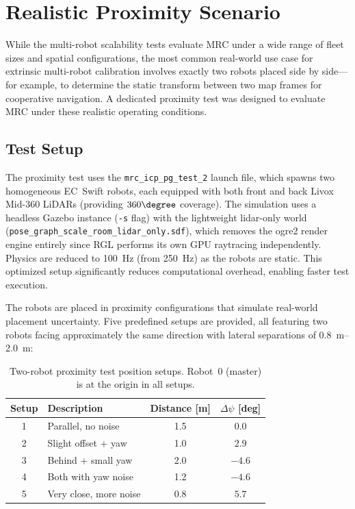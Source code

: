 \section{Realistic Proximity Scenario}
\label{sec:proximity_test}

While the multi-robot scalability tests evaluate MRC under a wide
range of fleet sizes and spatial configurations, the most common
real-world use case for extrinsic multi-robot calibration involves
exactly two robots placed side by side---for example, to determine
the static transform between two map frames for cooperative
navigation.
A dedicated proximity test was designed to evaluate MRC under
these realistic operating conditions.

\subsection{Test Setup}

The proximity test uses the \texttt{mrc\_icp\_pg\_test\_2} launch
file, which spawns two homogeneous EC~Swift robots, each equipped
with both front and back Livox Mid-360 LiDARs (providing
$360\degree$ coverage).
The simulation uses a headless Gazebo instance (\texttt{-s} flag)
with the lightweight lidar-only world
(\texttt{pose\_graph\_scale\_room\_lidar\_only.sdf}), which
removes the ogre2 render engine entirely since RGL performs its
own GPU raytracing independently.
Physics are reduced to \SI{100}{\hertz} (from \SI{250}{\hertz})
as the robots are static.
This optimized setup significantly reduces computational overhead,
enabling faster test execution.

The robots are placed in proximity configurations that simulate
real-world placement uncertainty.
Five predefined setups are provided, all featuring two robots
facing approximately the same direction with lateral separations
of \SIrange{0.8}{2.0}{\metre}:

\begin{table}[htbp]
    \centering
    \caption{Two-robot proximity test position setups.
             Robot~0 (master) is at the origin in all setups.}
    \label{tab:proximity_setups}
    \small
    \begin{tabular}{c l c c}
        \toprule
        \textbf{Setup}
            & \textbf{Description}
            & \textbf{Distance} [m]
            & $\Delta\psi$ [deg] \\
        \midrule
        1 & Parallel, no noise     & 1.5  & $0.0$ \\
        2 & Slight offset + yaw    & 1.0  & $2.9$ \\
        3 & Behind + small yaw     & 2.0  & $-4.6$ \\
        4 & Both with yaw noise    & 1.2  & $-4.6$ \\
        5 & Very close, more noise & 0.8  & $5.7$ \\
        \bottomrule
    \end{tabular}
\end{table}

